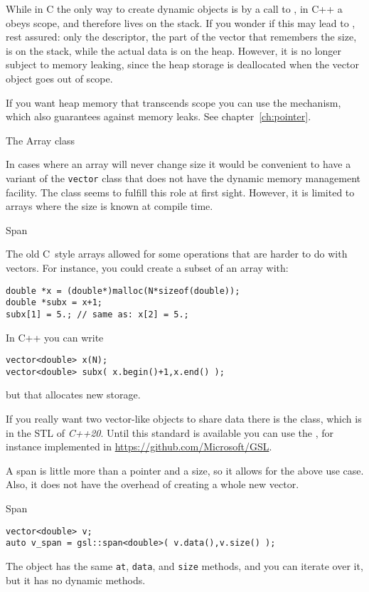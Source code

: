 While in C the only way to create dynamic objects is by a call to
, in C++ a  obeys scope, and
therefore lives on the stack. If you wonder if this may lead to
, rest assured: only the descriptor, the
part of the vector that remembers the size, is on the stack, while the
actual data is on the heap. However, it is no longer subject to memory
leaking, since the heap storage is deallocated when the vector object
goes out of scope.

If you want heap memory that transcends scope you can use the
 mechanism, which also guarantees against
memory leaks. See chapter~\ref{ch:pointer}.

 {The Array class}

In cases where an array will never change size it would be convenient
to have a variant of the \lstinline{vector} class that does not have
the dynamic memory management facility.
The  class seems to fulfill this role at first sight.
However, it
is limited to arrays where the size is known at compile time.

 {Span}
\label{sec:gsl-span}

The old C~style arrays allowed for some operations that are harder to
do with vectors. For instance, you could create a subset of an array with:
\begin{lstlisting}
double *x = (double*)malloc(N*sizeof(double));
double *subx = x+1;
subx[1] = 5.; // same as: x[2] = 5.;
\end{lstlisting}
In C++ you can write
\begin{lstlisting}
vector<double> x(N);
vector<double> subx( x.begin()+1,x.end() );
\end{lstlisting}
but that allocates new storage.

If you really want two vector-like objects to share data there is the
 class, which is in the \ac{STL} of
\emph{C++20}. Until this standard is available you
can use the , for instance implemented in
\url{https://github.com/Microsoft/GSL}.

A span is little more than a pointer and a size, so it allows for the
above use case. Also, it does not have the overhead of creating a
whole new vector.

\begin{block}{Span}
  \label{sl:spandef}
\begin{lstlisting}
vector<double> v;
auto v_span = gsl::span<double>( v.data(),v.size() );
\end{lstlisting}
The  object has the same \lstinline{at}, \lstinline{data}, and
\lstinline{size} methods, and you can iterate over it, but it has no
dynamic methods.
\end{block}

